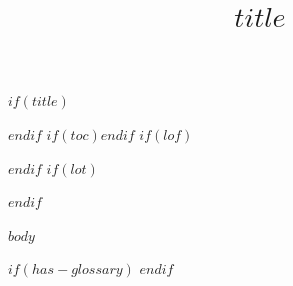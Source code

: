 \documentclass[11pt]{article}
\title{$title$}
\theoremstyle{plain}
\theoremstyle{definition}
\theoremstyle{remark}
\begin{document}
$if(title)$\maketitle$endif$
$if(toc)$\tableofcontents\newpage$endif$
$if(lof)$\listoffigures$endif$
$if(lot)$\listoftables$endif$

$body$

$if(has-glossary)$
\clearpage
\printglossary[type=\acronymtype, title={Acronyms}]
\printglossary[title={Glossary}]
$endif$
\end{document}
